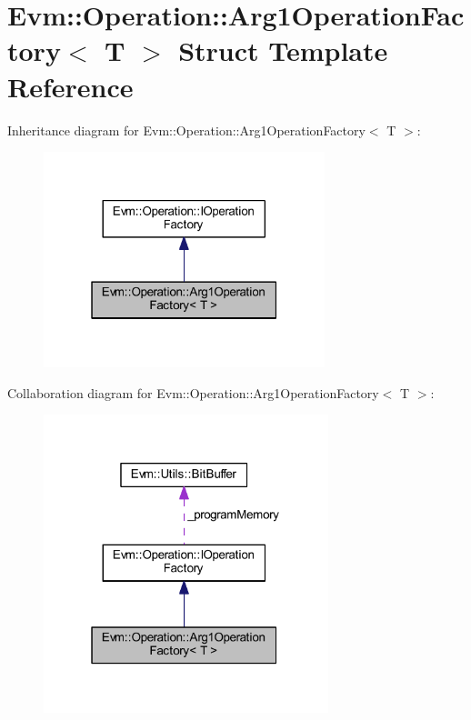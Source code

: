 \hypertarget{struct_evm_1_1_operation_1_1_arg1_operation_factory}{}\section{Evm\+:\+:Operation\+:\+:Arg1\+Operation\+Factory$<$ T $>$ Struct Template Reference}
\label{struct_evm_1_1_operation_1_1_arg1_operation_factory}


Inheritance diagram for Evm\+:\+:Operation\+:\+:Arg1\+Operation\+Factory$<$ T $>$\+:
\nopagebreak
\begin{figure}[H]
\begin{center}
\leavevmode
\includegraphics[width=232pt]{struct_evm_1_1_operation_1_1_arg1_operation_factory__inherit__graph}
\end{center}
\end{figure}


Collaboration diagram for Evm\+:\+:Operation\+:\+:Arg1\+Operation\+Factory$<$ T $>$\+:
\nopagebreak
\begin{figure}[H]
\begin{center}
\leavevmode
\includegraphics[width=235pt]{struct_evm_1_1_operation_1_1_arg1_operation_factory__coll__graph}
\end{center}
\end{figure}
